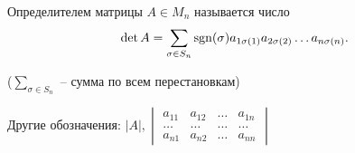 \begin{definition}
    Определителем матрицы $A \in M_n$ называется число
    \begin{equation*}
        \det A = \sum_{\sigma \in S_n} \operatorname{\mathop{\mathrm{sgn}}}(\sigma) a_{1\sigma(1)} a_{2 \sigma(2)} \dots a_{n\sigma(n)}
    .\end{equation*}

    ($\sum_{\sigma \in S_n}$ -- сумма по всем перестановкам)
\end{definition}

\bigskip
Другие обозначения: $|A|, \begin{vmatrix} a_{11} & a_{12} & \dots & a_{1n} \\ \dots & \dots & \dots & \dots \\ a_{n1} & a_{n2} & \dots & a_{nn} \end{vmatrix}$

